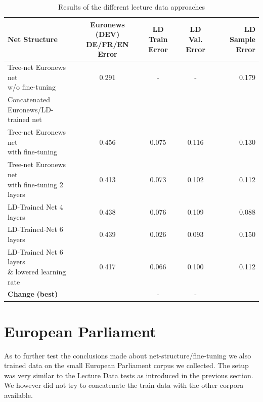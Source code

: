 \begin{table}
\caption{Results of the different lecture data approaches}
\label{tab:resultsLD}
\begin{tabular}{| l | c | c | c | r | }
	\hline
	\textbf{Net Structure} & \parbox[t]{2.5cm}{\textbf{Euronews (DEV)} \\ \textbf{DE/FR/EN Error}} & \parbox[t]{2.5cm}{\textbf{LD} \\ \textbf{Train Error}} & \parbox[t]{2.5cm}{\textbf{LD} \\ \textbf{Val. Error}} & \parbox[t]{2.5cm}{\textbf{LD} \\ \textbf{Sample Error}} \\
	\hline
	\parbox[t]{5cm}{Tree-net Euronews net \\
	 w/o fine-tuning}  & 0.291 & - & - & 0.179 \\
	\hline
	\parbox[t]{5cm}{Concatenated \\ Euronews/LD-trained net } & &  &  & \\
	\hdashline
	\parbox[t]{5cm}{Tree-net Euronews net \\ with fine-tuning } & 0.456 & 0.075 & 0.116 & 0.130 \\
	\hdashline
	\parbox[t]{5cm}{Tree-net Euronews net \\ with fine-tuning 2 layers } & 0.413 & 0.073 & 0.102 & 0.112 \\
	\hdashline
	\parbox[t]{5cm}{LD-Trained Net 4 layers} & 0.438 & 0.076 & 0.109 & 0.088 \\
	\hdashline
	LD-Trained-Net 6 layers & 0.439 & 0.026 & 0.093 & 0.150 \\
	\hdashline
	\parbox[t]{5cm}{LD-Trained Net 6 layers \\ \& lowered learning rate} & 0.417 & 0.066 & 0.100 & 0.112 \\
	\hline
	\parbox[t]{5cm}{\textbf{Change} \textbf{(best)}} &  & - & - &  \\
	\hline
\end{tabular}
\end{table}

\section{European Parliament}
\label{sec:EP}

As to further test the conclusions made about net-structure/fine-tuning we also trained data on the small European Parliament corpus we collected. The setup was very similar to the Lecture Data tests as introduced in the previous section.  We however did not try to concatenate the train data with the other corpora available.

